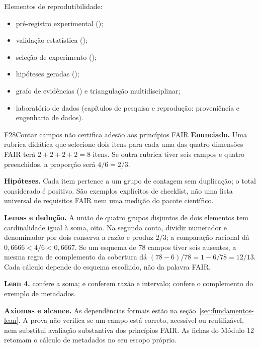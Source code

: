 \begin{arquitetura}
Elementos de reprodutibilidade:
\begin{itemize}[leftmargin=1.3em,itemsep=1pt]
  \item pré-registro experimental ();
  \item validação estatística ();
  \item seleção de experimento ();
  \item hipóteses geradas ();
  \item grafo de evidências () e
        triangulação multidisciplinar;
  \item laboratório de dados (capítulos de pesquisa e reprodução: proveniência e engenharia de dados).
\end{itemize}
\end{arquitetura}

\begin{formalizacao}{F28}{Contar campos não certifica adesão aos princípios FAIR}
\textbf{Enunciado.} Uma rubrica didática que selecione dois itens para cada uma das quatro dimensões FAIR terá $2+2+2+2=8$ itens. Se outra rubrica tiver seis campos e quatro preenchidos, a proporção será $4/6=2/3$.

\textbf{Hipóteses.} Cada item pertence a um grupo de contagem sem duplicação; o total considerado é positivo. São exemplos explícitos de checklist, não uma lista universal de requisitos FAIR nem uma medição do pacote científico.

\textbf{Lemas e dedução.} A união de quatro grupos disjuntos de dois elementos tem cardinalidade igual à soma, oito. Na segunda conta, dividir numerador e denominador por dois conserva a razão e produz $2/3$; a comparação racional dá $0{,}6666<4/6<0{,}6667$. Se um esquema de 78 campos tiver seis ausentes, a mesma regra de complemento da cobertura dá $(78-6)/78=1-6/78=12/13$. Cada cálculo depende do esquema escolhido, não da palavra FAIR.

\textbf{Lean 4.}  confere a soma;  e  conferem razão e intervalo;  confere o complemento do exemplo de metadados.

\textbf{Axiomas e alcance.} As dependências formais estão na seção~\ref{sec:fundamentos-lean}. A prova não verifica se um campo está correto, acessível ou reutilizável, nem substitui avaliação substantiva dos princípios FAIR. As fichas do Módulo 12 retomam o cálculo de metadados no seu escopo próprio.
\end{formalizacao}

